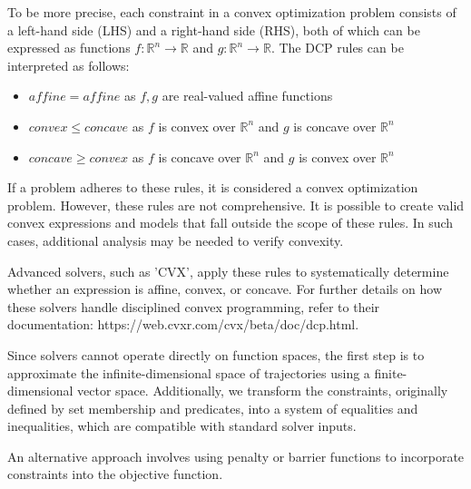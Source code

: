 To be more precise, each constraint in a convex optimization problem consists of a left-hand side (LHS) and a right-hand side (RHS), both of which
can be expressed as functions $f:\mathbb{R}^n\to \mathbb{R}$ and $g:\mathbb{R}^n\to \mathbb{R}$.
The DCP rules can be interpreted as follows:
\begin{itemize}
	\item $affine = affine$ as $f, g$ are real-valued affine functions
	\item $convex\leq concave$ as $f$ is convex over $\mathbb{R}^n$ and $g$ is concave over $\mathbb{R}^n$
	\item $concave\geq convex$ as $f$ is concave over $\mathbb{R}^n$ and $g$ is convex over $\mathbb{R}^n$
\end{itemize}

If a problem adheres to these rules, it is considered a convex optimization problem.
However, these rules are not comprehensive.
It is possible to create valid convex expressions and models that fall outside the scope of these rules.
In such cases, additional analysis may be needed to verify convexity.

Advanced solvers, such as 'CVX', apply these rules to systematically determine whether an expression is affine, convex, or concave.
For further details on how these solvers handle disciplined convex programming, refer to their documentation:
https://web.cvxr.com/cvx/beta/doc/dcp.html.

Since solvers cannot operate directly on function spaces, the first step is to approximate the infinite-dimensional space of trajectories using a
finite-dimensional vector space.
Additionally, we transform the constraints, originally defined by set membership and predicates, into a system of equalities and inequalities, which
are compatible with standard solver inputs.

An alternative approach involves using penalty or barrier functions to incorporate constraints into the objective function.

